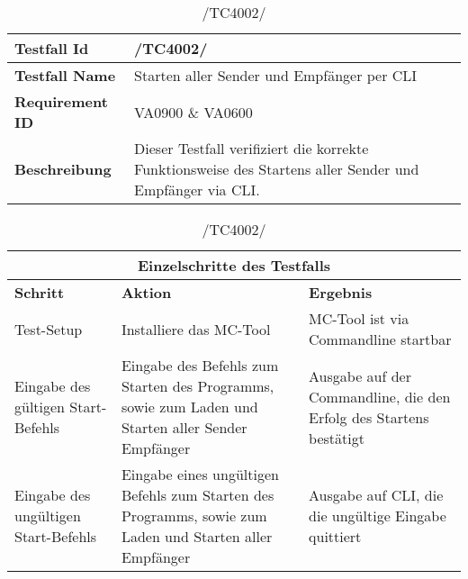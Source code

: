 \begin{table}[h]
\caption{/TC4002/}
\label{tab:TC4002}
\begin{center}
\begin{tabular}{|p{3.5cm}|p{9cm}|}
\hline
\textbf{Testfall Id} & /TC4002/\\
\hline
\textbf{Testfall Name} & Starten aller Sender und Empfänger per CLI\\
\hline
\textbf{Requirement ID} & VA0900 \& VA0600\\
\hline
\textbf{Beschreibung} & Dieser Testfall verifiziert die korrekte
Funktionsweise des Startens aller Sender und Empfänger via CLI.\\
\hline
\end{tabular}
\begin{tabular}{|p{2.5cm}|p{5cm}|p{4.55cm}|}
\multicolumn{3}{|c|}{\textbf{Einzelschritte des Testfalls}} \\
\hline
\textbf{Schritt} & \textbf{Aktion} & \textbf{Ergebnis}\\
\hline
Test-Setup & Installiere das MC-Tool & MC-Tool ist via
Commandline startbar\\
\hline
Eingabe des gültigen Start-Befehls & Eingabe des Befehls zum Starten des
Programms, sowie zum Laden und Starten aller Sender Empfänger & Ausgabe auf der
Commandline, die den Erfolg des Startens bestätigt
\\
\hline
Eingabe des ungültigen Start-Befehls & Eingabe eines ungültigen Befehls zum
Starten des Programms, sowie zum Laden und Starten aller Empfänger & Ausgabe auf
CLI, die die ungültige Eingabe quittiert
\\
\hline
\end{tabular}
\end{center}
\label{default}
\end{table}

